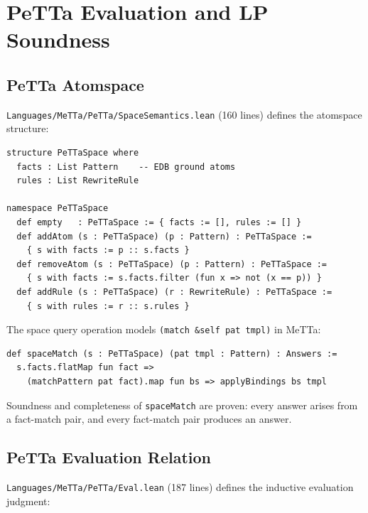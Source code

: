 \documentclass[]{article}
\newcommand{\code}[1]{\texttt{#1}}
\newcommand{\MeTTa}{\textup{MeTTa}}
\newcommand{\PeTTa}{\textup{PeTTa}}
\begin{document}
\section{\PeTTa{} Evaluation and LP Soundness}
\label{sec:petta}

\subsection{\PeTTa{} Atomspace}

\code{Languages/MeTTa/PeTTa/SpaceSemantics.lean} (160 lines) defines the atomspace structure:

\begin{lstlisting}[language=lean]
structure PeTTaSpace where
  facts : List Pattern    -- EDB ground atoms
  rules : List RewriteRule

namespace PeTTaSpace
  def empty   : PeTTaSpace := { facts := [], rules := [] }
  def addAtom (s : PeTTaSpace) (p : Pattern) : PeTTaSpace :=
    { s with facts := p :: s.facts }
  def removeAtom (s : PeTTaSpace) (p : Pattern) : PeTTaSpace :=
    { s with facts := s.facts.filter (fun x => not (x == p)) }
  def addRule (s : PeTTaSpace) (r : RewriteRule) : PeTTaSpace :=
    { s with rules := r :: s.rules }
\end{lstlisting}

The space query operation models \code{(match \&self pat tmpl)} in \MeTTa{}:

\begin{lstlisting}[language=lean]
def spaceMatch (s : PeTTaSpace) (pat tmpl : Pattern) : Answers :=
  s.facts.flatMap fun fact =>
    (matchPattern pat fact).map fun bs => applyBindings bs tmpl
\end{lstlisting}

Soundness and completeness of \code{spaceMatch} are proven:
every answer arises from a fact-match pair, and every fact-match pair
produces an answer.

\subsection{\PeTTa{} Evaluation Relation}

\code{Languages/MeTTa/PeTTa/Eval.lean} (187 lines) defines the inductive evaluation judgment:
\end{document}
